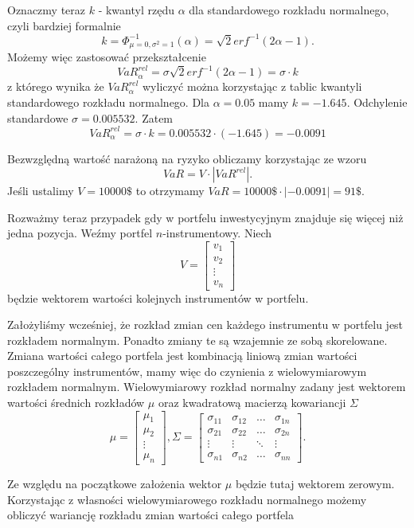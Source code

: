 \documentclass[11pt,titlepage]{article}
\begin{document}
Oznaczmy teraz $k$ - kwantyl rzędu $\alpha$ dla standardowego rozkładu normalnego, czyli bardziej formalnie 
$$k=\Phi_{\mu=0,\sigma^{2}=1}^{-1}(\alpha)=\sqrt{2} erf^{-1}(2\alpha-1).$$
Możemy więc zastosować przekształcenie
$$VaR_{\alpha}^{rel}   =\sigma \sqrt{2} erf^{-1}(2\alpha-1)=\sigma \cdot k$$
z którego wynika że $VaR_{\alpha}^{rel}$ wyliczyć można korzystając z tablic kwantyli standardowego rozkładu normalnego. Dla $\alpha=0.05$ mamy $k=-1.645$. Odchylenie standardowe $\sigma=0.005532$. Zatem
$$VaR_{\alpha}^{rel}=\sigma \cdot k= 0.005532 \cdot (-1.645)=-0.0091$$

Bezwzględną wartość narażoną na ryzyko obliczamy korzystając ze wzoru
$$VaR = V \cdot |VaR^{rel}|.$$
Jeśli ustalimy $V=10000\$$ to otrzymamy $VaR = 10000\$ \cdot |-0.0091| = 91\$ $.

Rozważmy teraz przypadek gdy w portfelu inwestycyjnym znajduje się więcej niż jedna pozycja. Weźmy portfel $n$-instrumentowy. Niech
$$V=\begin{bmatrix}
 v_1 \\ 
 v_2 \\
\vdots \\
v_n
\end{bmatrix}$$
będzie wektorem wartości kolejnych instrumentów w portfelu.

Założyliśmy wcześniej, że rozkład zmian cen każdego instrumentu w portfelu jest rozkładem normalnym. Ponadto zmiany te są wzajemnie ze sobą skorelowane. Zmiana wartości całego portfela jest kombinacją liniową zmian wartości poszczególny instrumentów, mamy więc do czynienia z wielowymiarowym rozkładem normalnym. Wielowymiarowy rozkład normalny zadany jest wektorem wartości średnich rozkładów $\mu$ oraz kwadratową macierzą kowariancji $\Sigma$
$$\mu=\begin{bmatrix}
 \mu_1 \\ 
 \mu_2 \\
\vdots \\
\mu_n
\end{bmatrix},\Sigma=\begin{bmatrix}
\sigma_{11} & \sigma_{12} & \hdots & \sigma_{1n} \\ 
\sigma_{21} & \sigma_{22} & \hdots & \sigma_{2n} \\
\vdots & \vdots & \ddots & \vdots\\
\sigma_{n1} & \sigma_{n2} & \hdots & \sigma_{nn}
\end{bmatrix}. $$

Ze względu na początkowe założenia wektor $\mu$ będzie tutaj wektorem zerowym. Korzystając z własności wielowymiarowego rozkładu normalnego możemy obliczyć wariancję rozkładu zmian wartości całego portfela 
\end{document}
